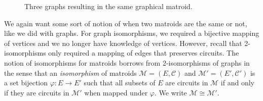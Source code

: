 \documentclass[12pt]{report}
\theoremstyle{definition}
\def\calC{\mathcal C}
\def\calM{\mathcal M}
\theoremstyle{upright}
\begin{document}
\begin{figure}[htbp]
\begin{center}
\begin{subfigure}[c]{0.45\linewidth}
\begin{center}
\begin{tikzpicture}
                \end{tikzpicture}
    
            \end{center}

        \end{subfigure}
        \begin{subfigure}[c]{0.25\linewidth}

            \begin{center}
        

            \end{center}

        \end{subfigure}
    
    \end{center}

    \vspace{-48pt}

    \caption{Three graphs resulting in the same graphical matroid.}\label{fig:GraphicalMatroid}

\end{figure}

We again want some sort of notion of when two matroids are the same or not, like we did with graphs.
For graph isomorphisms, we required a bijective mapping of vertices and we no longer have knowledge of vertices.
However, recall that 2-isomorphisms only required a mapping of edges that preserves circuits.
The notion of isomorphisms for matroids borrows from 2-isomorphisms of graphs in the sense that an {\em isomorphism} of matroids $\calM=(E, \calC)$ and $\calM'=(E', \calC')$ is a set bijection $\varphi:E\to E'$ such that all subsets of $E$ are circuits in $\calM$ if and only if they are circuits in $\calM'$ when mapped under $\varphi$.
We write $\calM\cong\calM'$.
\end{document}
